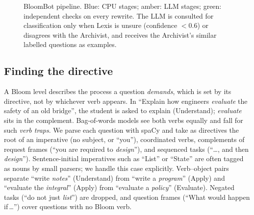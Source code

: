 \documentclass[conference]{IEEEtran}
\begin{document}
\begin{figure}[t]
{}
\caption{BloomBot pipeline. Blue: CPU stages; amber: LLM stages; green: independent checks on
every rewrite. The LLM is consulted for classification only when Lexis is unsure (confidence
$<0.6$) or disagrees with the Archivist, and receives the Archivist's similar labelled questions as examples.}
\label{fig:pipeline}
\end{figure}

\subsection{Finding the directive}
A Bloom level describes the process a question \emph{demands}, which is set by its directive,
not by whichever verb appears. In ``Explain how engineers \emph{evaluate} the safety of an old
bridge'', the student is asked to explain (Understand); \emph{evaluate} sits in the complement.
Bag-of-words models see both verbs equally and fall for such \emph{verb traps}. We parse each
question with spaCy \cite{spacy} and take as directives the root of an imperative (no subject, or
``you''), coordinated verbs, complements of request frames (``you are required to
\emph{design}''), and sequenced tasks (``\ldots, and then \emph{design}''). Sentence-initial
imperatives such as ``List'' or ``State'' are often tagged as nouns by small parsers; we handle
this case explicitly. Verb--object pairs separate ``write \emph{notes}'' (Understand) from ``write
a \emph{program}'' (Apply) and ``evaluate the \emph{integral}'' (Apply) from ``evaluate a
\emph{policy}'' (Evaluate). Negated tasks (``do not just \emph{list}'') are dropped, and
question frames (``What would happen if\,\ldots'') cover questions with no Bloom verb.
\end{document}
